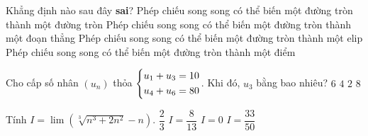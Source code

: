 \begin{ex}%
	Khẳng định nào sau đây \textbf{sai}?
	\choice
	{Phép chiếu song song có thể biến một đường tròn thành một đường tròn}
	{Phép chiếu song song có thể biến một đường tròn thành một đoạn thẳng}
	{Phép chiếu song song có thể biến một đường tròn thành một elip}
	{\True Phép chiếu song song có thể biến một đường tròn thành một điểm}
\end{ex}
\begin{ex}%
	Cho cấp số nhân $(u_n)$ thỏa $\left\{\begin{aligned}&u_1+u_3=10\\&u_4+u_6=80\end{aligned}\right.$. Khi đó, $u_3$ bằng bao nhiêu?
	\choice
	{$6$}
	{$4$}
	{$2$}
	{\True $8$}
\end{ex}
\begin{ex}%
	Tính $I=\lim \left( \sqrt[3]{n^3+2n^2}-n\right) $.
	\choice
	{\True $\dfrac{2}{3}$}
	{$I=\dfrac{8}{13}$}
	{$I=0$}
	{$I=\dfrac{33}{50}$}
\end{ex}
